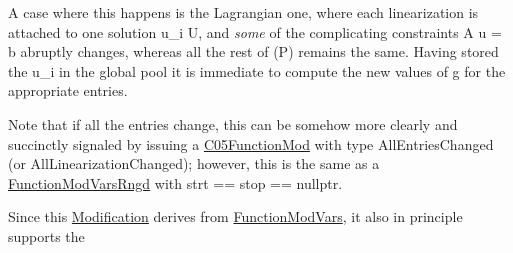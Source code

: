A case where this happens is the Lagrangian one, where each linearization is attached to one solution u\+\_\+i  U, and {\itshape some} of the complicating constraints A u = b abruptly changes, whereas all the rest of (P) remains the same. Having stored the u\+\_\+i in the global pool it is immediate to compute the new values of g for the appropriate entries.

Note that if all the entries change, this can be somehow more clearly and succinctly signaled by issuing a \mbox{\hyperlink{class_s_m_spp__di__unipi__it_1_1_c05_function_mod}{C05\+Function\+Mod}} with type All\+Entries\+Changed (or All\+Linearization\+Changed); however, this is the same as a \mbox{\hyperlink{class_s_m_spp__di__unipi__it_1_1_function_mod_vars_rngd}{Function\+Mod\+Vars\+Rngd}} with strt == stop == nullptr.

Since this \mbox{\hyperlink{class_s_m_spp__di__unipi__it_1_1_modification}{Modification}} derives from \mbox{\hyperlink{class_s_m_spp__di__unipi__it_1_1_function_mod_vars}{Function\+Mod\+Vars}}, it also in principle supports the


